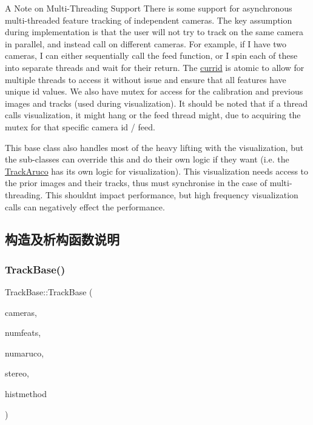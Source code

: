 \begin{DoxyParagraph}{A Note on Multi-\/\+Threading Support}
There is some support for asynchronous multi-\/threaded feature tracking of independent cameras. The key assumption during implementation is that the user will not try to track on the same camera in parallel, and instead call on different cameras. For example, if I have two cameras, I can either sequentially call the feed function, or I spin each of these into separate threads and wait for their return. The \hyperlink{classov__core_1_1TrackBase_af59db0441bf16f0e7c62d8f3bd09e5f0}{currid} is atomic to allow for multiple threads to access it without issue and ensure that all features have unique id values. We also have mutex for access for the calibration and previous images and tracks (used during visualization). It should be noted that if a thread calls visualization, it might hang or the feed thread might, due to acquiring the mutex for that specific camera id / feed.
\end{DoxyParagraph}
This base class also handles most of the heavy lifting with the visualization, but the sub-\/classes can override this and do their own logic if they want (i.\+e. the \hyperlink{classov__core_1_1TrackAruco}{Track\+Aruco} has its own logic for visualization). This visualization needs access to the prior images and their tracks, thus must synchronise in the case of multi-\/threading. This shouldn\textquotesingle{}t impact performance, but high frequency visualization calls can negatively effect the performance. 

\subsection{构造及析构函数说明}
\mbox{\label{classov__core_1_1TrackBase_a645127d6e03e66b96959ececccb3ffc0}} 
\subsubsection{\texorpdfstring{Track\+Base()}{TrackBase()}}
{\footnotesize\ttfamily Track\+Base\+::\+Track\+Base (\begin{DoxyParamCaption}\item[{std\+::unordered\+\_\+map$<$ size\+\_\+t, std\+::shared\+\_\+ptr$<$ \hyperlink{classov__core_1_1CamBase}{Cam\+Base} $>$$>$}]{cameras,  }\item[{int}]{numfeats,  }\item[{int}]{numaruco,  }\item[{bool}]{stereo,  }\item[{\hyperlink{classov__core_1_1TrackBase_aa4b34a5dce99b59522d57bf9278c9a1a}{Histogram\+Method}}]{histmethod }\end{DoxyParamCaption})}




